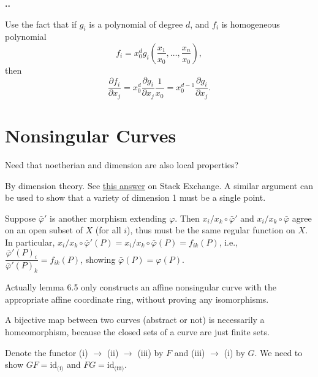 \documentclass{note}
\makeatletter
\newcounter{exercise}[section]
\newcommand\Ex{
    \if@noskipsec \leavevmode \fi
    \par
    \refstepcounter{exercise}
    \textbf{\thesection.\arabic{exercise}.}
}
\newcommand{\id}{\mathrm{id}}
\makeatother
\begin{document}
\setcounter{exercise}{7}
\Ex
Use the fact that if $g_i$ is a polynomial of degree $d$, and $f_i$ is
homogeneous polynomial
\begin{equation*}
  f_i = x_0^d g_i\left(\frac{x_1}{x_0}, \dots, \frac{x_n}{x_0}\right),
\end{equation*}
then
\begin{equation*}
  \frac{\partial f_i}{\partial x_j}
  = x_0^d\frac{\partial g_i}{\partial x_j}\frac{1}{x_0}
  = x_0^{d-1}\frac{\partial g_i}{\partial x_j}.
\end{equation*}

\section{Nonsingular Curves}
 Need that noetherian and dimension are also local
properties?

By dimension theory. See
\href{https://math.stackexchange.com/questions/140592/closed-proper-subvarieties-of-curves-are-finite-sets-of-points}
{this answer} on Stack Exchange. A similar argument can be used to show that a
variety of dimension 1 must be a single point.

Suppose $\bar\varphi'$ is another morphism extending $\varphi$. Then
$x_i/x_k\circ\bar\varphi'$ and $x_i/x_k\circ\bar\varphi$ agree on an open
subset of $X$ (for all $i$), thus must be the same regular function on $X$. In
particular, $x_i/x_k\circ\bar\varphi'(P) = x_i/x_k\circ\bar\varphi(P) =
  f_{ik}(P)$, i.e., $\dfrac{\bar\varphi'(P)_i}{\bar\varphi'(P)_k} = f_{ik}(P)$,
showing $\bar\varphi(P) = \varphi(P)$.

 Actually lemma 6.5 only constructs an affine nonsingular curve
with the appropriate affine coordinate ring, without proving any isomorphisms.

A bijective map between two curves (abstract or not) is necessarily a
homeomorphism, because the closed sets of a curve are just finite sets.

Denote the functor (i) $\to$ (ii) $\to$ (iii) by $F$ and (iii) $\to$ (i) by
$G$. We need to show $GF=\id_{\text{(i)}}$ and $FG=\id_{\text{(iii)}}$.
\end{document}
